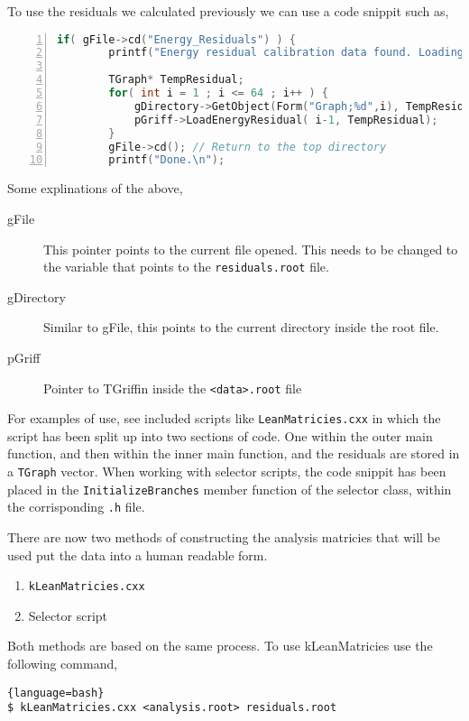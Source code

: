 \documentclass[10pt]{article} %
\begin{document}
To use the residuals we calculated previously we can use a code snippit such as,
\begin{lstlisting}[language=c++,numbers=left, xleftmargin=5.0ex,caption=Example residual code for loading residuals]
    if( gFile->cd("Energy_Residuals") ) {
        printf("Energy residual calibration data found. Loading...\n");

        TGraph* TempResidual;
        for( int i = 1 ; i <= 64 ; i++ ) {
            gDirectory->GetObject(Form("Graph;%d",i), TempResidual);
            pGriff->LoadEnergyResidual( i-1, TempResidual);
        }
        gFile->cd(); // Return to the top directory
        printf("Done.\n");
\end{lstlisting}
Some explinations of the above,
\begin{description}
\item [gFile]
This pointer points to the current file opened. This needs to be changed to the variable that points to the \texttt{residuals.root} file.
\item [gDirectory]
Similar to gFile, this points to the current directory inside the root file.
\item [pGriff]
Pointer to TGriffin inside the \texttt{<data>.root} file
\end{description}
For examples of use, see included scripts like \texttt{LeanMatricies.cxx} in which the script has been split up into two sections of code.
One within the outer main function, and then within the inner main function, and the residuals are stored in a \texttt{TGraph} vector.
When working with selector scripts, the code snippit has been placed in the \texttt{InitializeBranches} member function of the selector class, within the corrisponding \texttt{.h} file.

There are now two methods of constructing the analysis matricies that will be used put the data into a human readable form.

\begin{enumerate}
\item  \texttt{kLeanMatricies.cxx}
\item Selector script
\end{enumerate}

Both methods are based on the same process. To use kLeanMatricies use the following command,

\begin{lstlisting}{language=bash}
$ kLeanMatricies.cxx <analysis.root> residuals.root
\end{lstlisting}
\end{document}

